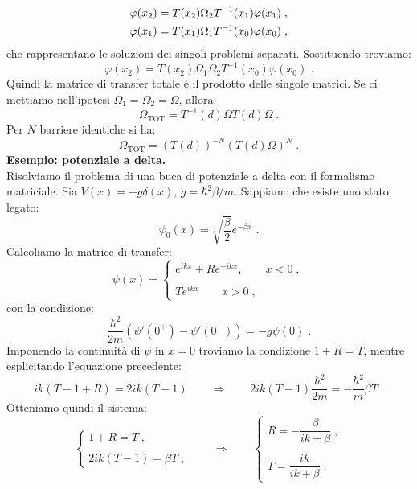 \documentclass[10pt,a4paper]{report}
\theoremstyle{definition}
\numberwithin{equation}{section}
\begin{document}
\begin{align}
\varphi(x_2) &= T(x_2)\Omega_2 T^{-1}(x_1)\varphi(x_1)\;, \notag \\
\varphi(x_1) &= T(x_1)\Omega_1 T^{-1}(x_0)\varphi(x_0)\;,
\end{align}
che rappresentano le soluzioni dei singoli problemi separati. Sostituendo troviamo:
\begin{equation}
\varphi(x_2)=T(x_2)\Omega_1\Omega_2 T^{-1}(x_0)\varphi(x_0)\;.
\end{equation}
Quindi la matrice di transfer totale è il prodotto delle singole matrici. Se ci mettiamo nell'ipotesi $\Omega_1=\Omega_2=\Omega$, allora:
$$
\Omega_{\mathrm{TOT}}=T^{-1}(d)\Omega T(d)\Omega\;.
$$
Per $N$ barriere identiche si ha:
\begin{equation}
\Omega_{\mathrm{TOT}}=(T(d))^{-N}(T(d)\Omega)^N\;.
\end{equation}
\textbf{Esempio: potenziale a delta.} \\
Risolviamo il problema di una buca di potenziale a delta con il formalismo matriciale. Sia $V(x)=-g\delta(x)$, $g=\hbar^2 \beta/m$. Sappiamo che esiste uno stato legato:
\begin{equation}
\psi_0(x)=\sqrt{\frac{\beta}{2}}e^{-\beta x}\;.
\end{equation}
Calcoliamo la matrice di transfer:
\begin{equation}
\psi(x)=\begin{cases}
e^{ikx}+Re^{-ikx}, \qquad x<0\;, \\
\\
Te^{ikx} \qquad x>0\;,
\end{cases}
\end{equation}
con la condizione:
\begin{equation}
\frac{\hbar^2}{2m}(\psi'(0^+)-\psi'(0^-))=-g\psi(0)\;.
\end{equation}
Imponendo la continuità di $\psi$ in $x=0$ troviamo la condizione $1+R=T$, mentre esplicitando l'equazione precedente:
\begin{equation}
ik(T-1+R)=2ik(T-1) \qquad \Longrightarrow \qquad 2ik(T-1)\frac{\hbar^2}{2m}=-\frac{\hbar^2}{m}\beta T\;.
\end{equation}
Otteniamo quindi il sistema:
\begin{equation}
\begin{cases}
1+R=T\;, \\
\\
2ik(T-1)=\beta T\;,
\end{cases} \qquad \Longrightarrow \qquad 
\begin{cases}
R=-\dfrac{\beta}{ik+\beta}\;, \\
\\
T=\dfrac{ik}{ik+\beta}\;.
\end{cases}
\end{equation}
\end{document}
